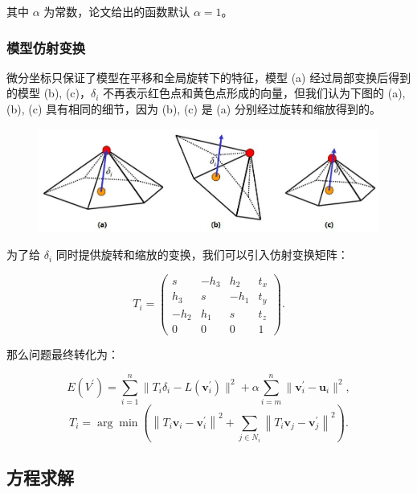 \documentclass[lang=cn,11pt,a4paper]{elegantpaper}
\begin{document}
其中 $\alpha$ 为常数，论文给出的函数默认 $\alpha = 1$。

\subsubsection{模型仿射变换}

微分坐标只保证了模型在平移和全局旋转下的特征，模型 (a) 经过局部变换后得到的模型 (b), (c)，$\delta_i$ 不再表示红色点和黄色点形成的向量，但我们认为下图的 (a), (b), (c) 具有相同的细节，因为 (b), (c) 是 (a) 分别经过旋转和缩放得到的。

\begin{figure}[ht]
\centering
\includegraphics[width=0.9\linewidth]{image/laplacian_rotation.jpeg} 
\end{figure}

为了给 $\delta_i$ 同时提供旋转和缩放的变换，我们可以引入仿射变换矩阵：

\begin{equation}
    T_{i}=\left(\begin{array}{cccc}
s & -h_{3} & h_{2} & t_{x} \\
h_{3} & s & -h_{1} & t_{y} \\
-h_{2} & h_{1} & s & t_{z} \\
0 & 0 & 0 & 1
\end{array}\right).
\end{equation}

那么问题最终转化为：

\begin{equation}
    E(V^{\prime})=\sum_{i=1}^{n} \| T_i\delta_{i}-L(\mathbf{v}_{i}^{\prime})\|^{2}+ \alpha \sum_{i=m}^{n}\| \mathbf{v}_{i}^{\prime}-\mathbf{u}_{i} \|^{2},\label{eq1}
\end{equation}
\begin{equation}
    T_i = \arg\min \left(\left\|T_{i}
    \mathbf{v}_{i}-\mathbf{v}_{i}^{\prime}\right\|^{2}+\sum_{j \in N_{i}}\left\|T_{i} \mathbf{v}_{j}-\mathbf{v}_{j}^{\prime}\right\|^{2}\right).\label{eq2}
\end{equation}

\subsection{方程求解}
\end{document}
